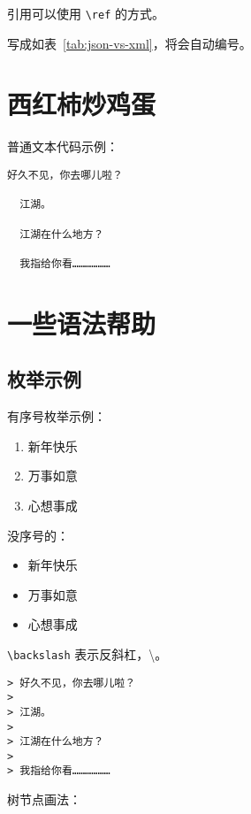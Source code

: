 引用可以使用 \verb!\ref! 的方式。

写成如表~\ref{tab:json-vs-xml}，将会自动编号。

\section{西红柿炒鸡蛋}

普通文本代码示例：

\begin{lstlisting}[]
  好久不见，你去哪儿啦？

  江湖。

  江湖在什么地方？

  我指给你看………………
\end{lstlisting}


\section{一些语法帮助}

\subsection{枚举示例}

有序号枚举示例：

\begin{enumerate}
  \item 新年快乐
  \item 万事如意
  \item 心想事成
\end{enumerate}

没序号的：

\begin{itemize}
  \item 新年快乐
  \item 万事如意
  \item 心想事成
\end{itemize}

\verb!\backslash! 表示反斜杠，\backslash。


\begin{lstlisting}[]
> 好久不见，你去哪儿啦？
>
> 江湖。
>
> 江湖在什么地方？
>
> 我指给你看………………
\end{lstlisting}

树节点画法：

